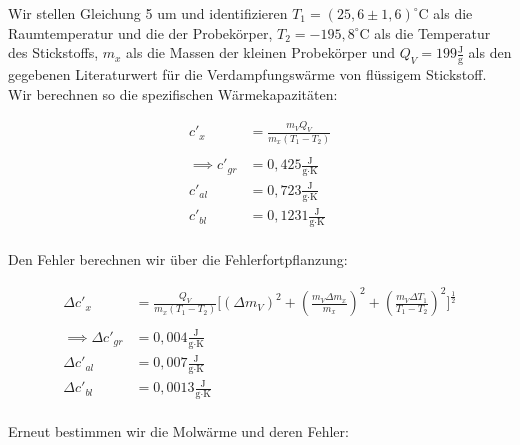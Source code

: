 \documentclass{article}
\begin{document}
Wir stellen Gleichung 5 um und identifizieren $T_1 = (25,6 \pm 1,6)^\circ$C als die Raumtemperatur und die der Probekörper,  $T_2 = -195,8^\circ$C als die Temperatur des Stickstoffs, $m_x$ als die Massen der kleinen Probekörper und $Q_V = 199 \frac{\text{J}}{\text{g}}$ als den gegebenen Literaturwert für die Verdampfungswärme von flüssigem Stickstoff. Wir berechnen so die spezifischen Wärmekapazitäten:

\begin{equation}
    \begin{split}
        c'_x &= \frac{m_V Q_V}{m_x (T_1 - T_2)} \\ \\
        \implies c'_{gr} &= 0,425 \frac{\text{J}}{\text{g} \cdot \text{K}} \\
        c'_{al} &= 0,723 \frac{\text{J}}{\text{g} \cdot \text{K}} \\
        c'_{bl} &= 0,1231 \frac{\text{J}}{\text{g} \cdot \text{K}} \\
    \end{split}
\end{equation}

Den Fehler berechnen wir über die Fehlerfortpflanzung:

\begin{equation}
    \begin{split}
        \Delta c'_x &= \frac{Q_V}{m_x (T_1 - T_2)} \Biggl[ \left( \Delta m_V \right)^2 + \left( \frac{m_V \Delta m_x}{m_x} \right)^2 + \left( \frac{m_V \Delta T_1}{T_1 - T_2} \right)^2 \Biggr]^{\frac{1}{2}} \\ \\
        \implies \Delta c'_{gr} &= 0,004 \frac{\text{J}}{\text{g} \cdot \text{K}} \\
        \Delta c'_{al} &= 0,007 \frac{\text{J}}{\text{g} \cdot \text{K}} \\
        \Delta c'_{bl} &= 0,0013 \frac{\text{J}}{\text{g} \cdot \text{K}} \\
    \end{split}
\end{equation}

Erneut bestimmen wir die Molwärme und deren Fehler:
\end{document}

